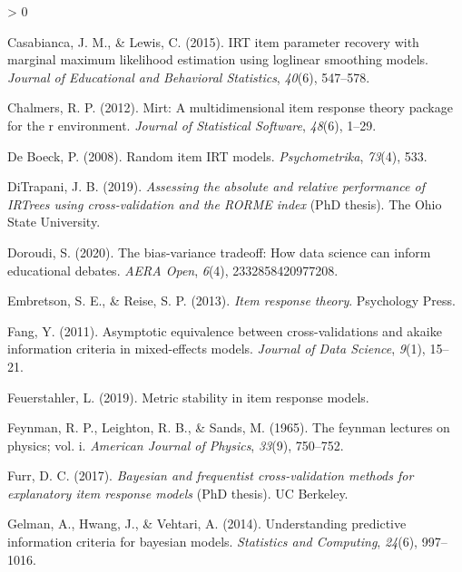 \documentclass[
  english,
  man,floatsintext]{apa7}
\newlength{\cslhangindent}
\newenvironment{CSLReferences}[2] %
 {%
  \setlength{\parindent}{0pt}
  \ifodd #1 \everypar{\setlength{\hangindent}{\cslhangindent}}\ignorespaces\fi
  \ifnum #2 > 0
  \setlength{\parskip}{#2\baselineskip}
  \fi
 }%
 {}
\begin{document}
\begin{CSLReferences}{1}{0}
\leavevmode\hypertarget{ref-casabianca2015irt}{}%
Casabianca, J. M., \& Lewis, C. (2015). IRT item parameter recovery with marginal maximum likelihood estimation using loglinear smoothing models. \emph{Journal of Educational and Behavioral Statistics}, \emph{40}(6), 547--578.

\leavevmode\hypertarget{ref-chalmers2012mirt}{}%
Chalmers, R. P. (2012). Mirt: A multidimensional item response theory package for the r environment. \emph{Journal of Statistical Software}, \emph{48}(6), 1--29.

\leavevmode\hypertarget{ref-de2008random}{}%
De Boeck, P. (2008). Random item IRT models. \emph{Psychometrika}, \emph{73}(4), 533.

\leavevmode\hypertarget{ref-ditrapani2019assessing}{}%
DiTrapani, J. B. (2019). \emph{Assessing the absolute and relative performance of IRTrees using cross-validation and the RORME index} (PhD thesis). The Ohio State University.

\leavevmode\hypertarget{ref-doroudi2020bias}{}%
Doroudi, S. (2020). The bias-variance tradeoff: How data science can inform educational debates. \emph{AERA Open}, \emph{6}(4), 2332858420977208.

\leavevmode\hypertarget{ref-embretson2013item}{}%
Embretson, S. E., \& Reise, S. P. (2013). \emph{Item response theory}. Psychology Press.

\leavevmode\hypertarget{ref-fang2011asymptotic}{}%
Fang, Y. (2011). Asymptotic equivalence between cross-validations and akaike information criteria in mixed-effects models. \emph{Journal of Data Science}, \emph{9}(1), 15--21.

\leavevmode\hypertarget{ref-feuerstahlercharacterizing}{}%
Feuerstahler, L. (2019). Metric stability in item response models.

\leavevmode\hypertarget{ref-feynman1965feynman}{}%
Feynman, R. P., Leighton, R. B., \& Sands, M. (1965). The feynman lectures on physics; vol. i. \emph{American Journal of Physics}, \emph{33}(9), 750--752.

\leavevmode\hypertarget{ref-furr2017bayesian}{}%
Furr, D. C. (2017). \emph{Bayesian and frequentist cross-validation methods for explanatory item response models} (PhD thesis). UC Berkeley.

\leavevmode\hypertarget{ref-gelman2014understanding}{}%
Gelman, A., Hwang, J., \& Vehtari, A. (2014). Understanding predictive information criteria for bayesian models. \emph{Statistics and Computing}, \emph{24}(6), 997--1016.


\end{CSLReferences}
\end{document}
